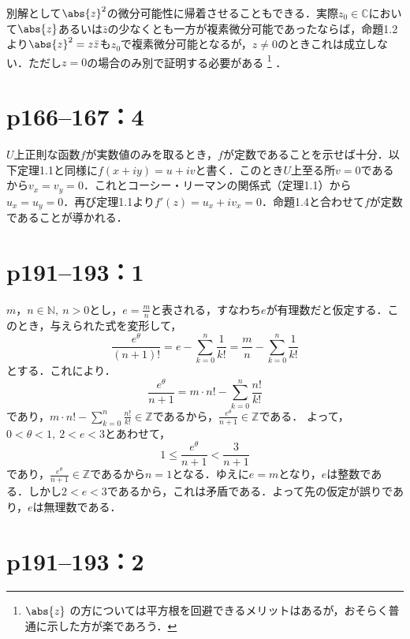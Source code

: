 別解として$\abs{z}^2$の微分可能性に帰着させることもできる．実際$z_0 \in \mathbb{C}$において$\abs{z}$あるいは$\bar{z}$の少なくとも一方が複素微分可能であったならば，命題1.2より$\abs{z}^2 = z\bar{z}$も$z_0$で複素微分可能となるが，$z \neq 0$のときこれは成立しない．ただし$z = 0$の場合のみ別で証明する必要がある%
\footnote{$\abs{z}$ の方については平方根を回避できるメリットはあるが，おそらく普通に示した方が楽であろう．}%
．


\section*{p166--167：4}

\begin{tproof}
    $U$上正則な函数$f$が実数値のみを取るとき，$f$が定数であることを示せば十分．以下定理1.1と同様に$f(x + iy) = u + iv$と書く．このとき$U$上至る所$v = 0$であるから$v_x = v_y = 0$．これとコーシー・リーマンの関係式（定理1.1）から$u_x = u_y = 0$．再び定理1.1より$f'(z) = u_x + iv_x = 0$．命題1.4と合わせて$f$が定数であることが導かれる．
\end{tproof}

\section*{p191--193：1}


\begin{tproof}
    $m，n \in \mathbb{N},~n >0$とし，$e=\frac{m}{n}$と表される，すなわち$e$が有理数だと仮定する．このとき，与えられた式を変形して，
    \[
        \frac{e^\theta}{(n+1)!} = e-\sum_{k=0}^{n} \frac{1}{k!} =\frac{m}{n}-\sum_{k=0}^{n} \frac{1}{k!}
    \]
    とする．これにより．
    \[
        \frac{e^{\theta}}{n+1} = m \cdot n! - \sum_{k=0}^{n} \frac{n!}{k!}
    \]
    であり，$m \cdot n! - \sum_{k=0}^{n} \frac{n!}{k!} \in \mathbb{Z}$であるから，$\frac{e^{\theta}}{n+1} \in \mathbb{Z}$である．
    よって，$0< \theta <1,~2<e<3$とあわせて，
    \[
        1 \le \frac{e^{\theta}}{n+1} < \frac{3}{n+1}
    \]
    であり，$\frac{e^{\theta}}{n+1} \in \mathbb{Z}$であるから$n=1$となる．ゆえに$e=m$となり，$e$は整数である．しかし$2<e<3$であるから，これは矛盾である．よって先の仮定が誤りであり，$e$は無理数である．
\end{tproof}



\section*{p191--193：2}

